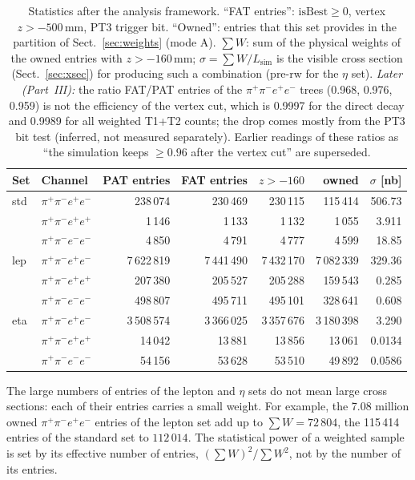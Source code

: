 \documentclass[11pt,a4paper]{article}
\newcommand{\ppee}{\ensuremath{\pi^{+}\pi^{-}e^{+}e^{-}}\xspace}
\newcommand{\Lsim}{\ensuremath{L_{\mathrm{sim}}}\xspace}
\begin{document}
\begin{table}[!htbp]
\centering
\caption{Statistics after the analysis framework. ``FAT entries'': $\mathrm{isBest}\ge0$,
vertex $z>-500$\,mm, PT3 trigger bit. ``Owned'': entries that this set provides in the
partition of Sect.~\ref{sec:weights} (mode A). $\sum W$: sum of the physical weights of the
owned entries with $z>-160$\,mm; $\sigma = \sum W/\Lsim$ is the visible cross section (Sect.~\ref{sec:xsec}) for producing such
a combination (pre-rw for the $\eta$ set). \emph{Later (Part~III):} the ratio FAT/PAT entries of the \ppee trees (0.968, 0.976,
0.959) is not the efficiency of the vertex cut, which is 0.9997 for the direct decay and 0.9989 for all weighted T1+T2 counts;
the drop comes mostly from the PT3 bit test (inferred, not measured separately). Earlier readings of these ratios as ``the
simulation keeps $\ge0.96$ after the vertex cut'' are superseded.}
\label{tab:fat}
\begin{tabular}{@{}l l r r r r r@{}}
\toprule
Set & Channel & PAT entries & FAT entries & $z>-160$ & owned & $\sigma$ [nb] \\
\midrule
std & \ppee        &   238\,074 &   230\,469 &   230\,115 &   115\,414 & 506.73 \\
    & $\pi^+\pi^-e^+e^+$ &  1\,146 &  1\,133 &  1\,132 &  1\,055 & 3.911 \\
    & $\pi^+\pi^-e^-e^-$ &  4\,850 &  4\,791 &  4\,777 &  4\,599 & 18.85 \\
\midrule
lep & \ppee        & 7\,622\,819 & 7\,441\,490 & 7\,432\,170 & 7\,082\,339 & 329.36 \\
    & $\pi^+\pi^-e^+e^+$ &   207\,380 &   205\,527 &   205\,288 &   159\,543 & 0.285 \\
    & $\pi^+\pi^-e^-e^-$ &   498\,807 &   495\,711 &   495\,101 &   328\,641 & 0.608 \\
\midrule
eta & \ppee        & 3\,508\,574 & 3\,366\,025 & 3\,357\,676 & 3\,180\,398 & 3.290 \\
    & $\pi^+\pi^-e^+e^+$ &    14\,042 &    13\,881 &    13\,856 &    13\,061 & 0.0134 \\
    & $\pi^+\pi^-e^-e^-$ &    54\,156 &    53\,628 &    53\,510 &    49\,892 & 0.0586 \\
\bottomrule
\end{tabular}
\end{table}

The large numbers of entries of the lepton and $\eta$ sets do not mean large cross sections: each
of their entries carries a small weight. For example, the 7.08 million owned \ppee entries of the
lepton set add up to $\sum W = 72\,804$, the 115\,414 entries of the standard set to
$112\,014$. The statistical power of a weighted sample is set by its effective number of
entries, $(\sum W)^2/\sum W^2$, not by the number of its entries.
\end{document}
